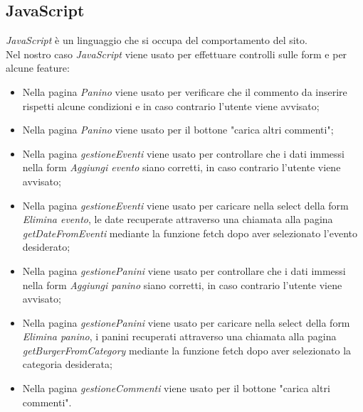\subsection{JavaScript}
\emph{JavaScript} è un linguaggio che si occupa del comportamento del sito.\\
Nel nostro caso \emph{JavaScript} viene usato per effettuare controlli sulle form e per alcune feature:
\begin{itemize}
    \item Nella pagina \emph{Panino} viene usato per verificare che il commento da inserire rispetti alcune condizioni e in caso contrario l'utente viene avvisato;
    \item Nella pagina \emph{Panino} viene usato per il bottone "carica altri commenti";
    \item Nella pagina \emph{gestioneEventi} viene usato per controllare che i dati immessi nella form \emph{Aggiungi evento} siano corretti, in caso contrario l'utente viene avvisato;
    \item Nella pagina \emph{gestioneEventi} viene usato per caricare nella select della form \emph{Elimina evento}, le date recuperate attraverso una chiamata alla pagina \emph{getDateFromEventi} mediante la funzione fetch dopo aver selezionato l'evento desiderato;
    \item Nella pagina \emph{gestionePanini} viene usato per controllare che i dati immessi nella form \emph{Aggiungi panino} siano corretti, in caso contrario l'utente viene avvisato;
    \item Nella pagina \emph{gestionePanini} viene usato per caricare nella select della form \emph{Elimina panino}, i panini recuperati attraverso una chiamata alla pagina \emph{getBurgerFromCategory} mediante la funzione fetch dopo aver selezionato la categoria desiderata;
    \item Nella pagina \emph{gestioneCommenti} viene usato per il bottone "carica altri commenti".
\end{itemize}